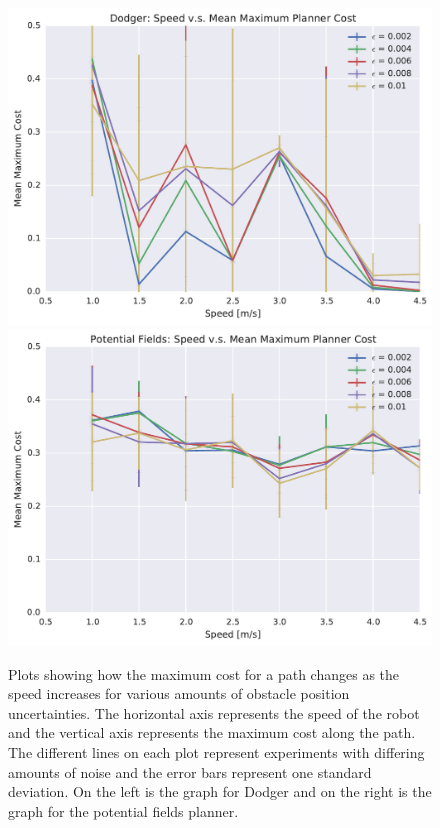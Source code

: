 \begin{figure}[h!]
    \centering

    \includegraphics[width=0.48\linewidth]{figs/planner_mean_max_cost_2}
    \includegraphics[width=0.48\linewidth]{figs/pf_mean_max_cost_2}

    \caption{Plots showing how the maximum cost for a path changes as the
        speed increases for various amounts of obstacle position uncertainties.
        The horizontal axis represents the speed of the robot and the vertical
        axis represents the maximum cost along the path. The different lines on
    each plot represent experiments with differing amounts of noise and the
error bars represent one standard deviation.  On the left is the graph for
Dodger and on the right is the graph for the potential fields planner.}

\end{figure}

